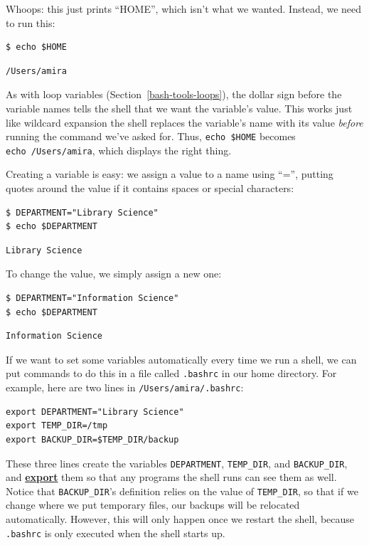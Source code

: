\documentclass[
]{krantz}
\newcommand{\gref}[2]{\hyperlink{#2}{\textbf{#1}}}
\begin{document}
Whoops: this just prints ``HOME'', which isn't what we wanted.
Instead,
we need to run this:

\begin{verbatim}
$ echo $HOME
\end{verbatim}

\begin{verbatim}
/Users/amira
\end{verbatim}

As with loop variables (Section~\ref{bash-tools-loops}),
the dollar sign before the variable names tells the shell
that we want the variable's value.
This works just like wildcard expansion
the shell replaces the variable's name with its value
\emph{before} running the command we've asked for.
Thus,
\texttt{echo\ \$HOME} becomes \texttt{echo\ /Users/amira},
which displays the right thing.

Creating a variable is easy:
we assign a value to a name using ``='',
putting quotes around the value if it contains spaces or special characters:

\begin{verbatim}
$ DEPARTMENT="Library Science"
$ echo $DEPARTMENT
\end{verbatim}

\begin{verbatim}
Library Science
\end{verbatim}

To change the value, we simply assign a new one:

\begin{verbatim}
$ DEPARTMENT="Information Science"
$ echo $DEPARTMENT
\end{verbatim}

\begin{verbatim}
Information Science
\end{verbatim}

If we want to set some variables automatically every time we run a shell,
we can put commands to do this in a file called \texttt{.bashrc} in our home directory.
For example,
here are two lines in \texttt{/Users/amira/.bashrc}:

\begin{verbatim}
export DEPARTMENT="Library Science"
export TEMP_DIR=/tmp
export BACKUP_DIR=$TEMP_DIR/backup
\end{verbatim}

These three lines create the variables \texttt{DEPARTMENT},
\texttt{TEMP\_DIR},
and \texttt{BACKUP\_DIR},
and \gref{export}{export\_variable} them so that any programs the shell runs can see them as well.
Notice that \texttt{BACKUP\_DIR}'s definition relies on the value of \texttt{TEMP\_DIR},
so that if we change where we put temporary files,
our backups will be relocated automatically.
However,
this will only happen once we restart the shell,
because \texttt{.bashrc} is only executed when the shell starts up.
\end{document}
